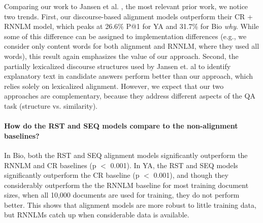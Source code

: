 Comparing our work to Jansen et al. , the most relevant prior work, we notice two trends.
First, our discourse-based alignment models outperform their CR + RNNLM model, which peaks at 26.6\% P@1 for YA and 31.7\% for Bio \emph{why}. While some of this difference can be assigned to implementation differences (e.g., we consider only content words for both alignment and RNNLM, where they used all words), this result again emphasizes the value of our approach.
Second, the partially lexicalized discourse structures used by Jansen et. al to identify explanatory text in candidate answers perform better than our approach, which relies solely on lexicalized alignment. However, we expect that our two approaches are complementary, because they address different aspects of the QA task (structure vs. similarity).

\paragraph{How do the RST and SEQ models compare to the non-alignment baselines?}


In Bio, both the RST and SEQ alignment models significantly outperform the RNNLM and CR baselines (p $<$ 0.001).  %
In YA, the RST and SEQ models significantly outperform the CR baseline (p $<$ 0.001), and though 
they considerably outperform the the RNNLM baseline for most training document sizes, when all 10,000 documents are used for training, they do not perform  better.  
This shows that alignment models are more robust to little training data, but RNNLMs catch up when considerable data is available.

